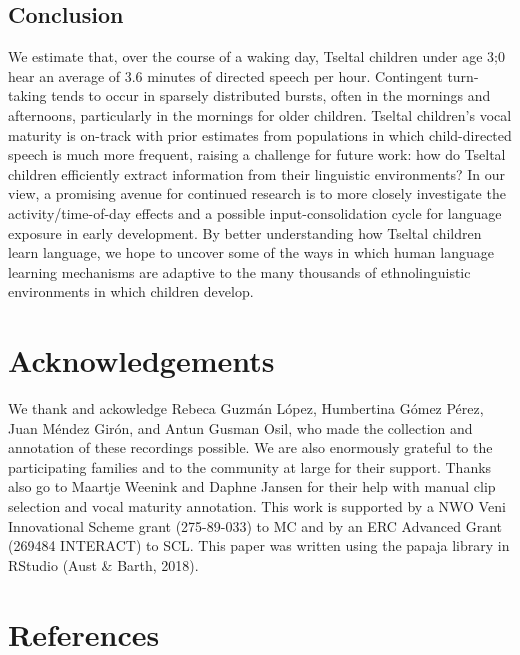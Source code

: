 \documentclass[floatsintext,man]{apa6}
\theoremstyle{definition}
\theoremstyle{definition}
\theoremstyle{definition}
\theoremstyle{remark}
\begin{document}
\subsection{Conclusion}\label{disc-conclusion}

We estimate that, over the course of a waking day, Tseltal children
under age 3;0 hear an average of 3.6 minutes of directed speech per
hour. Contingent turn-taking tends to occur in sparsely distributed
bursts, often in the mornings and afternoons, particularly in the
mornings for older children. Tseltal children's vocal maturity is
on-track with prior estimates from populations in which child-directed
speech is much more frequent, raising a challenge for future work: how
do Tseltal children efficiently extract information from their
linguistic environments? In our view, a promising avenue for continued
research is to more closely investigate the activity/time-of-day effects
and a possible input-consolidation cycle for language exposure in early
development. By better understanding how Tseltal children learn
language, we hope to uncover some of the ways in which human language
learning mechanisms are adaptive to the many thousands of
ethnolinguistic environments in which children develop.

\section{Acknowledgements}\label{acknowledgements}

We thank and ackowledge Rebeca Guzmán López, Humbertina Gómez Pérez,
Juan Méndez Girón, and Antun Gusman Osil, who made the collection and
annotation of these recordings possible. We are also enormously grateful
to the participating families and to the community at large for their
support. Thanks also go to Maartje Weenink and Daphne Jansen for their
help with manual clip selection and vocal maturity annotation. This work
is supported by a NWO Veni Innovational Scheme grant (275-89-033) to MC
and by an ERC Advanced Grant (269484 INTERACT) to SCL. This paper was
written using the papaja library in RStudio (Aust \& Barth, 2018).

\newpage

\section{References}\label{refs}

\begingroup
\setlength{\parindent}{-0.5in} \setlength{\leftskip}{0.5in}
\end{document}
